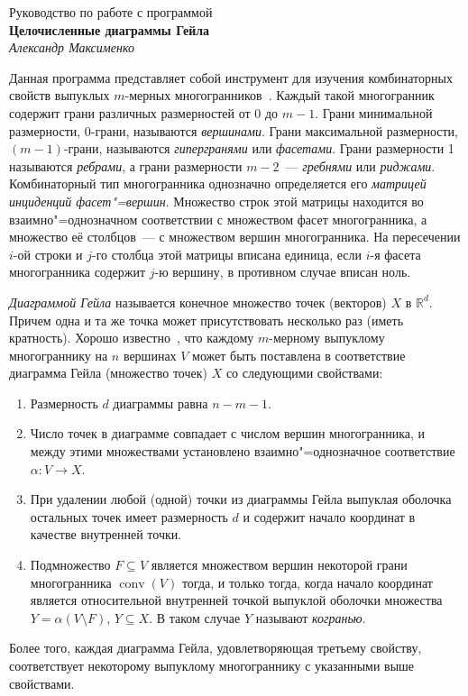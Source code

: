 \documentclass[12pt]{article}
\newcommand{\R}{\mathbb{R}}
\newcommand{\from}{\colon}
\DeclareMathOperator{\conv}{conv}
\begin{document}
\begin{center}
\large 
Руководство по работе с программой\\[0.5\baselineskip]
\textbf{Целочисленные диаграммы Гейла}\\[0.5\baselineskip]
\emph{Александр Максименко}\\
\end{center}


Данная программа представляет собой инструмент для изучения комбинаторных свойств выпуклых $m$-мерных многогранников~\cite{Grunbaum:2003, Ziegler:2014}.
Каждый такой многогранник содержит грани различных размерностей от 0 до $m-1$.
Грани минимальной размерности, 0-грани, называются \emph{вершинами}.
Грани максимальной размерности, $(m-1)$-грани,
называются \emph{гипергранями} или \emph{фасетами}.
Грани размерности 1 называются \emph{ребрами}, 
а грани размерности $m-2$~--- \emph{гребнями} или \emph{риджами}.
Комбинаторный тип многогранника однозначно определяется его \emph{матрицей инциденций фасет"=вершин}. 
Множество строк этой матрицы находится во взаимно"=однозначном соответствии с множеством фасет многогранника, а множество её столбцов~--- с множеством вершин многогранника.
На пересечении $i$-ой строки и $j$-го столбца этой матрицы вписана единица, 
если $i$-я фасета многогранника содержит $j$-ю вершину,
в противном случае вписан ноль.

\emph{Диаграммой Гейла} называется конечное множество точек (векторов) $X$ в $\R^d$.
Причем одна и та же точка может присутствовать несколько раз (иметь кратность).
Хорошо известно~\cite{Grunbaum:2003, Ziegler:2014}, что каждому $m$-мерному выпуклому многограннику на $n$ вершинах $V$ может быть поставлена в соответствие диаграмма Гейла (множество точек) $X$ со следующими свойствами:
\begin{enumerate}
	\item Размерность $d$ диаграммы равна $n - m - 1$.
	\item Число точек в диаграмме совпадает с числом вершин многогранника, и между этими множествами установлено взаимно"=однозначное соответствие $\alpha\from V \to X$.
	\item При удалении любой (одной) точки из диаграммы Гейла выпуклая оболочка остальных точек имеет размерность $d$ и содержит начало координат в качестве внутренней точки. 
	\item Подмножество $F \subseteq V$ является множеством вершин некоторой грани многогранника $\conv(V)$ тогда, и только тогда, когда начало координат является относительной внутренней точкой выпуклой оболочки множества $Y = \alpha(V \setminus F)$, $Y \subseteq X$.
	В таком случае $Y$ называют \emph{когранью}.
\end{enumerate}
Более того, каждая диаграмма Гейла, удовлетворяющая третьему свойству, соответствует некоторому выпуклому многограннику с указанными выше свойствами.
\end{document}
